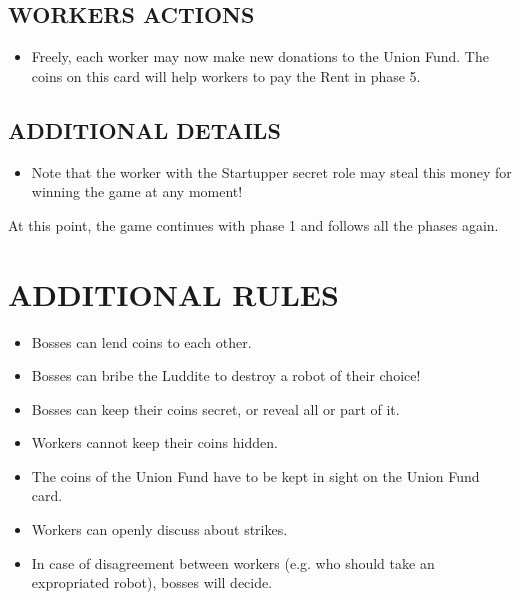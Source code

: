     \subsection{WORKERS ACTIONS}

        \begin{itemize}
            \item Freely, each worker may now make new donations to the Union Fund. The
            coins on this card will help workers to pay the Rent in phase 5.
        \end{itemize}
    
    \subsection{ADDITIONAL DETAILS}

        \begin{itemize}
            \item Note that the worker with the Startupper secret role may steal this money for
            winning the game at any moment!
        \end{itemize}

        At this point, the game continues with phase 1 and follows all the phases
        again.

\section{ADDITIONAL RULES}

    \begin{itemize}
        \item Bosses can lend coins to each other.
        \item Bosses can bribe the Luddite to destroy a robot of their choice!
        \item Bosses can keep their coins secret, or reveal all or part of it.
        \item Workers cannot keep their coins hidden.
        \item The coins of the Union Fund have to be kept in sight on the Union Fund card.
        \item Workers can openly discuss about strikes.
        \item In case of disagreement between workers (e.g. who should take an expropriated
        robot), bosses will decide.
    \end{itemize}



